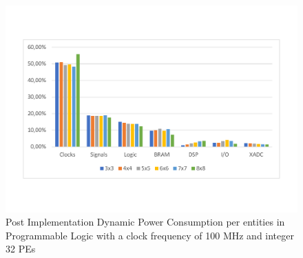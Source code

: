 \begin{figure}[!htbp]
\centering
\captionsetup{justification=centering}
\includegraphics[scale=0.6,angle=0]{./figure/graphs/power_pldyn_div_int32_freq_100mhz.pdf}
\caption{Post Implementation Dynamic Power Consumption per entities in Programmable Logic with a clock frequency of 100 MHz and integer 32 PEs}
\label{fig:dynpowint32ent100}
\end{figure}

